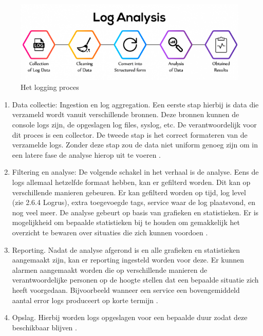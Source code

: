 \begin{figure}[ht]
    \centering
    \includegraphics[scale=0.6]{img/log_proces}
    \caption[Het logging proces]{Het logging proces \cite{nastel}}
\end{figure}

\begin{enumerate}
    \item Data collectie: Ingestion en log aggregation. Een eerste stap hierbij is data die verzameld wordt vanuit verschillende bronnen. Deze bronnen kunnen de console logs zijn, de opgeslagen log files, syslog, etc. De verantwoordelijk voor dit proces is een collector. De tweede stap is het correct formateren van de verzamelde logs. Zonder deze stap zou de data niet uniform genoeg zijn om in een latere fase de analyse hierop uit te voeren \autocite{logdna2018}. 
    \item Filtering en analyse: De volgende schakel in het verhaal is de analyse. Eens de logs allemaal hetzelfde formaat hebben, kan er gefilterd worden. Dit kan op verschillende manieren gebeuren. Er kan gefilterd worden op tijd, log level (zie 2.6.4 Logrus), extra toegevoegde tags, service waar de log plaatsvond, en nog veel meer. De analyse gebeurt op basis van grafieken en statistieken. Er is mogelijkheid om bepaalde statistieken bij te houden om gemakkelijk het overzicht te bewaren over situaties die zich kunnen voordoen  \autocite{logdna2018}.
    \item Reporting. Nadat de analyse afgerond is en alle grafieken en statistieken aangemaakt zijn, kan er reporting ingesteld worden voor deze. Er kunnen alarmen aangemaakt worden die op verschillende manieren de verantwoordelijke personen op de hoogte stellen dat een bepaalde situatie zich heeft voorgedaan. Bijvoorbeeld wanneer een service een bovengemiddeld aantal error logs produceert op korte termijn  \autocite{logdna2018}.
    \item Opslag. Hierbij worden logs opgeslagen voor een bepaalde duur zodat deze beschikbaar blijven  \autocite{logdna2018}.
\end{enumerate}


